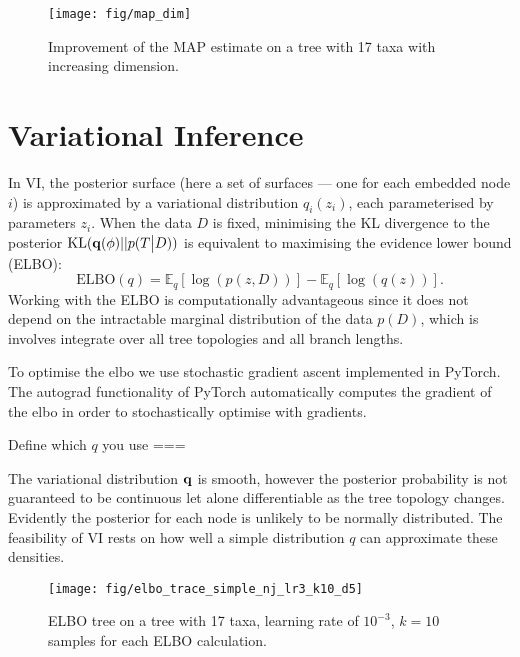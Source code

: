\documentclass[11pt, twocolumn]{article}
\newcommand{\be}{\begin{equation*}}
\newcommand{\ee}{\end{equation*}}
\begin{document}
\begin{figure}[htbp] \label{fig:map_dim}
\begin{center}
    \texttt{[image: fig/map\_dim]}
\end{center}
\caption{Improvement of the MAP estimate on a tree with 17 taxa with increasing dimension.}
\end{figure}

\section{Variational Inference}
In VI, the posterior surface (here a set of surfaces --- one for each embedded node $i$) is approximated by a variational distribution $q_{i}(z_{i})$, each parameterised by parameters $z_{i}$.
When the data $D$ is fixed, minimising the KL divergence to the posterior $\text{KL}({\bf q}(\phi)||p(T\big|D))$ is equivalent to maximising the evidence lower bound (ELBO):
\be
\text{ELBO}(q) = \mathbb{E}_{q}[\log(p(z,D))] - \mathbb{E}_{q}[\log(q(z))].
\ee
Working with the ELBO is computationally advantageous since it does not depend on the intractable marginal distribution of the data $p(D)$, which is involves integrate over all tree topologies and all branch lengths.

To optimise the elbo we use stochastic gradient ascent implemented in PyTorch.
The autograd functionality of PyTorch automatically computes the gradient of the elbo in order to stochastically optimise with gradients.

Define which $q$ you use ===

The variational distribution $\bold{q}$ is smooth, however the posterior probability is not guaranteed to be continuous let alone differentiable as the tree topology changes.
Evidently the posterior for each node is unlikely to be normally distributed.
The feasibility of VI rests on how well a simple distribution $q$ can approximate these densities.

\begin{figure}[htbp] \label{fig:elbo_trace}
\begin{center}
    \texttt{[image: fig/elbo\_trace\_simple\_nj\_lr3\_k10\_d5]}
\end{center}
\caption{ELBO tree on a tree with 17 taxa, learning rate of $10^{-3}$, $k=10$ samples for each ELBO calculation.}
\end{figure}
\end{document}
